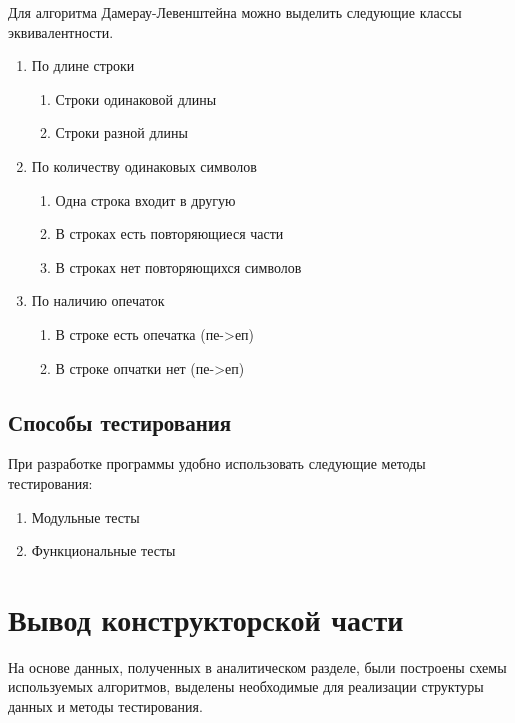 Для алгоритма Дамерау-Левенштейна можно выделить следующие классы эквивалентности.

\begin{enumerate}
    \item По длине строки
    \begin{enumerate}
        \item Строки одинаковой длины
        \item Строки разной длины
    \end{enumerate} 
    \item По количеству одинаковых символов
    \begin{enumerate}
        \item Одна строка входит в другую
        \item В строках есть повторяющиеся части
        \item В строках нет повторяющихся символов
    \end{enumerate} 
    \item По наличию опечаток
    \begin{enumerate}
        \item В строке есть опечатка (пе->еп)
        \item В строке опчатки нет (пе->еп)
    \end{enumerate} 
\end{enumerate}


\subsection{Способы тестирования}\label{TestingMethods}

При разработке программы удобно использовать следующие методы тестирования:

\begin{enumerate}
    \item Модульные тесты 
    \item Функциональные тесты 
\end{enumerate} 

\section{Вывод конструкторской части}\label{KonstructResult}
На основе данных, полученных в аналитическом разделе, были построены схемы используемых алгоритмов,
выделены необходимые для реализации структуры данных и методы тестирования.

